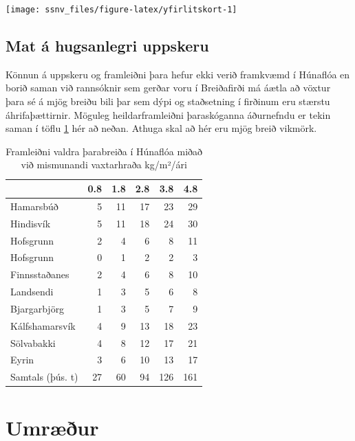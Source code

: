 \documentclass[icelandic,]{book}
\begin{document}
\begin{center}\texttt{[image: ssnv\_files/figure-latex/yfirlitskort-1]} \end{center}

\hypertarget{mat-a-hugsanlegri-uppskeru}{%
\section{Mat á hugsanlegri uppskeru}\label{mat-a-hugsanlegri-uppskeru}}

Könnun á uppskeru og framleiðni þara hefur ekki verið framkvæmd í Húnaflóa en borið saman við rannsóknir sem gerðar voru í Breiðafirði má áætla að vöxtur þara sé á mjög breiðu bili þar sem dýpi og staðsetning í firðinum eru stærstu áhrifaþættirnir. Möguleg heildarframleiðni þaraskóganna áðurnefndu er tekin saman í töflu \ref{tab:frml} hér að neðan. Athuga skal að hér eru mjög breið vikmörk.

\begin{table}[t]

\caption{\label{tab:frml}Framleiðni valdra þarabreiða í Húnaflóa miðað við mismunandi vaxtarhraða kg/m²/ári}
\centering
\begin{tabular}{lrrrrr}
\toprule
  & 0.8 & 1.8 & 2.8 & 3.8 & 4.8\\
\midrule
Hamarsbúð & 5 & 11 & 17 & 23 & 29\\
Hindisvík & 5 & 11 & 18 & 24 & 30\\
Hofsgrunn & 2 & 4 & 6 & 8 & 11\\
Hofsgrunn & 0 & 1 & 2 & 2 & 3\\
Finnsstaðanes & 2 & 4 & 6 & 8 & 10\\
\addlinespace
Landsendi & 1 & 3 & 5 & 6 & 8\\
Bjargarbjörg & 1 & 3 & 5 & 7 & 9\\
Kálfshamarsvík & 4 & 9 & 13 & 18 & 23\\
Sölvabakki & 4 & 8 & 12 & 17 & 21\\
Eyrin & 3 & 6 & 10 & 13 & 17\\
\addlinespace
Samtals (þús. t) & 27 & 60 & 94 & 126 & 161\\
\bottomrule
\end{tabular}
\end{table}

\hypertarget{umrur}{%
\chapter{Umræður}\label{umrur}}
\end{document}
